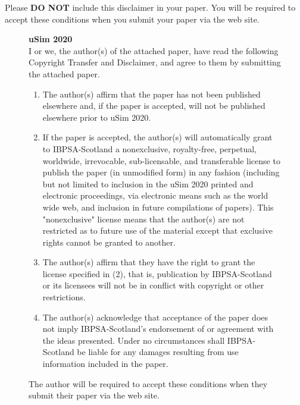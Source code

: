 \documentclass[twocolumn, a4paper,10pt]{article}
\begin{document}
\newpage
\onecolumn
Please \textbf{DO NOT} include this disclaimer in your paper.  You will be required to accept these conditions when you  submit your paper via the web site.
\begin{figure*}
\centering
\begin{boxedminipage}{\textwidth}
\textbf{uSim 2020}\\

I or we, the author(s) of the attached paper, have read the following Copyright Transfer and Disclaimer, and agree to them by submitting the attached paper.
\begin{enumerate}
\item
The author(s) affirm that the paper has not been published elsewhere and, if the paper is accepted, will not be published elsewhere prior to uSim 2020.
\item
If the paper is accepted, the author(s) will automatically grant to IBPSA-Scotland a nonexclusive, royalty-free, perpetual, worldwide, irrevocable, sub-licensable, and transferable license to publish the paper (in unmodified form) in any fashion (including but not limited to inclusion in the uSim 2020 printed and electronic proceedings, via electronic means such as the world wide web, and inclusion in future compilations of papers).  This "nonexclusive" license means that the author(s) are not restricted as to future use of the material except that exclusive rights cannot be granted to another.
\item
The author(s) affirm that they have the right to grant the license specified in (2), that is, publication by IBPSA-Scotland or its licensees will not be in conflict with copyright or other restrictions.
\item
The author(s) acknowledge that acceptance of the paper does not imply IBPSA-Scotland's endorsement of or agreement with the ideas presented.  Under no circumstances shall IBPSA-Scotland be liable for any damages resulting from use information included in the paper.
\end{enumerate}
\end{boxedminipage}
\caption{The author will be required to accept these conditions when they submit their paper via the web site.}
\label{fig:fig02}
\end{figure*}
\end{document}
